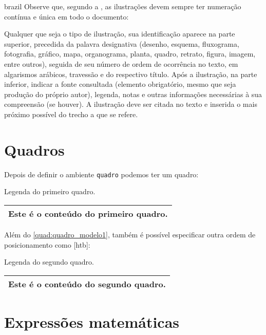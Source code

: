 \begin{otherlanguage*}{brazil}
Observe que, segundo a , as
ilustrações devem sempre ter numeração contínua e única em todo o documento:

\begin{citacao}
Qualquer que seja o tipo de ilustração, sua identificação aparece na parte
superior, precedida da palavra designativa (desenho, esquema, fluxograma,
fotografia, gráfico, mapa, organograma, planta, quadro, retrato, figura,
imagem, entre outros), seguida de seu número de ordem de ocorrência no texto,
em algarismos arábicos, travessão e do respectivo título. Após a ilustração, na
parte inferior, indicar a fonte consultada (elemento obrigatório, mesmo que
seja produção do próprio autor), legenda, notas e outras informações
necessárias à sua compreensão (se houver). A ilustração deve ser citada no
texto e inserida o mais próximo possível do trecho a que se
refere. \cite[seções 5.8]{NBR14724:2011}
\end{citacao}

\section{Quadros}

Depois de definir o ambiente \texttt{quadro} podemos ter um quadro:

\begin{quadro}
\caption{\label{quad:quadro_modelo1}Legenda do primeiro quadro.}
\centering
\begin{tabular}{|c|}
\hline
Este é o conteúdo do primeiro quadro.\\
\hline
\end{tabular}
\end{quadro}


Além do \autoref{quad:quadro_modelo1}, também é possível especificar outra ordem de posicionamento como [htb]:

\begin{quadro}[htb]
\centering
\caption{\label{quad:quadro_modelo2}Legenda do segundo quadro.}
\begin{tabular}{|c|}
\hline
Este é o conteúdo do segundo quadro.\\
\hline
\end{tabular}
\end{quadro}



\section{Expressões matemáticas}


\end{otherlanguage*}
